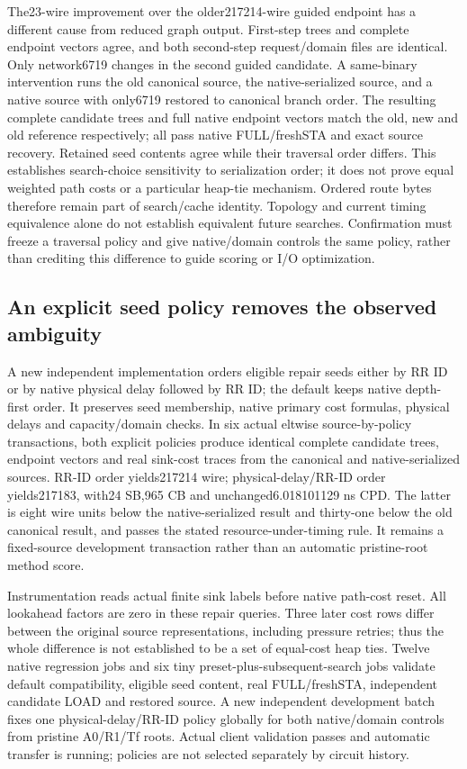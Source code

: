 \documentclass[conference,10pt]{IEEEtran}
\begin{document}
The23-wire improvement over the older217214-wire guided endpoint has a different cause from reduced graph output. First-step trees and complete endpoint vectors agree, and both second-step request/domain files are identical. Only network6719 changes in the second guided candidate. A same-binary intervention runs the old canonical source, the native-serialized source, and a native source with only6719 restored to canonical branch order. The resulting complete candidate trees and full native endpoint vectors match the old, new and old reference respectively; all pass native FULL/freshSTA and exact source recovery. Retained seed contents agree while their traversal order differs. This establishes search-choice sensitivity to serialization order; it does not prove equal weighted path costs or a particular heap-tie mechanism. Ordered route bytes therefore remain part of search/cache identity. Topology and current timing equivalence alone do not establish equivalent future searches. Confirmation must freeze a traversal policy and give native/domain controls the same policy, rather than crediting this difference to guide scoring or I/O optimization.

\subsection{An explicit seed policy removes the observed ambiguity}
A new independent implementation orders eligible repair seeds either by RR ID or by native physical delay followed by RR ID; the default keeps native depth-first order. It preserves seed membership, native primary cost formulas, physical delays and capacity/domain checks. In six actual eltwise source-by-policy transactions, both explicit policies produce identical complete candidate trees, endpoint vectors and real sink-cost traces from the canonical and native-serialized sources. RR-ID order yields217214 wire; physical-delay/RR-ID order yields217183, with24 SB,965 CB and unchanged6.018101129 ns CPD. The latter is eight wire units below the native-serialized result and thirty-one below the old canonical result, and passes the stated resource-under-timing rule. It remains a fixed-source development transaction rather than an automatic pristine-root method score.

Instrumentation reads actual finite sink labels before native path-cost reset. All lookahead factors are zero in these repair queries. Three later cost rows differ between the original source representations, including pressure retries; thus the whole difference is not established to be a set of equal-cost heap ties. Twelve native regression jobs and six tiny preset-plus-subsequent-search jobs validate default compatibility, eligible seed content, real FULL/freshSTA, independent candidate LOAD and restored source. A new independent development batch fixes one physical-delay/RR-ID policy globally for both native/domain controls from pristine A0/R1/Tf roots. Actual client validation passes and automatic transfer is running; policies are not selected separately by circuit history.
\end{document}
